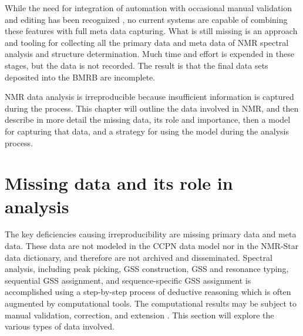 While the need for integration of automation with occasional manual 
validation and editing has been recognized \cite{baran2006spins}, no 
current systems are capable of combining these features with full 
meta data capturing.  
What is still missing is an approach and tooling for collecting all the primary 
data and meta data of NMR spectral analysis and structure determination.  Much 
time and effort is expended in these stages, but the data is not recorded.  The 
result is that the final data sets deposited into the BMRB are incomplete.



NMR data analysis is irreproducible because insufficient information is
captured during the process.  
This chapter will outline the data involved in NMR, and then 
describe in more detail the missing data, its role and importance, 
then a model for capturing that data, and a strategy for using
the model during the analysis process.



\section{Missing data and its role in analysis}
The key deficiencies causing irreproducibility are missing primary data and 
meta data.  These data are not modeled in the CCPN data model nor in the 
NMR-Star data dictionary, and therefore are not archived and disseminated.
Spectral analysis, including peak picking, GSS construction, GSS and resonance
typing, sequential GSS assignment, and sequence-specific GSS assignment is 
accomplished using a step-by-step process of deductive reasoning 
which is often augmented by computational tools.  The computational 
results may be subject to manual validation, correction, and extension
\cite{guerry2011automated}.  This section will explore the various types
of data involved.


